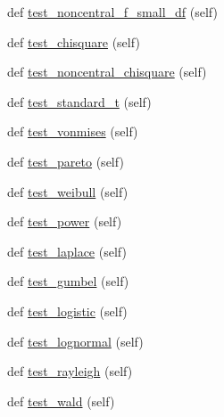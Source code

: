 \begin{DoxyCompactItemize}
\item 
def \hyperlink{classnumpy_1_1random_1_1tests_1_1test__random_1_1TestBroadcast_add84bec4de193f997366b0f0c9f57065}{test\+\_\+noncentral\+\_\+f\+\_\+small\+\_\+df} (self)
\item 
def \hyperlink{classnumpy_1_1random_1_1tests_1_1test__random_1_1TestBroadcast_aa9ed4d1e21057ee64ec67d97bd68fb9d}{test\+\_\+chisquare} (self)
\item 
def \hyperlink{classnumpy_1_1random_1_1tests_1_1test__random_1_1TestBroadcast_a1cd8cd8db8c0bd475aed24a6350083b0}{test\+\_\+noncentral\+\_\+chisquare} (self)
\item 
def \hyperlink{classnumpy_1_1random_1_1tests_1_1test__random_1_1TestBroadcast_a1b0a0d9e2eed0b7d30ef9bcee5ea97b8}{test\+\_\+standard\+\_\+t} (self)
\item 
def \hyperlink{classnumpy_1_1random_1_1tests_1_1test__random_1_1TestBroadcast_a2b38561ce5fd8be7f7de1d3da6d80758}{test\+\_\+vonmises} (self)
\item 
def \hyperlink{classnumpy_1_1random_1_1tests_1_1test__random_1_1TestBroadcast_a77f9eec0648cb9931b9553a539e4fbf3}{test\+\_\+pareto} (self)
\item 
def \hyperlink{classnumpy_1_1random_1_1tests_1_1test__random_1_1TestBroadcast_afd54e2ee72efb58e2fb034a2ba29a5ea}{test\+\_\+weibull} (self)
\item 
def \hyperlink{classnumpy_1_1random_1_1tests_1_1test__random_1_1TestBroadcast_a58abb751b2f08dd774d5916c95de4214}{test\+\_\+power} (self)
\item 
def \hyperlink{classnumpy_1_1random_1_1tests_1_1test__random_1_1TestBroadcast_a4b502eec5a77450f02f737076fe3cbe8}{test\+\_\+laplace} (self)
\item 
def \hyperlink{classnumpy_1_1random_1_1tests_1_1test__random_1_1TestBroadcast_a5817ccdde95cd0709767d55664d64c0c}{test\+\_\+gumbel} (self)
\item 
def \hyperlink{classnumpy_1_1random_1_1tests_1_1test__random_1_1TestBroadcast_a0bb498f1cbbf0948322e0b8b4afbd877}{test\+\_\+logistic} (self)
\item 
def \hyperlink{classnumpy_1_1random_1_1tests_1_1test__random_1_1TestBroadcast_a17865a1eb83569dba4c555c09aba27d6}{test\+\_\+lognormal} (self)
\item 
def \hyperlink{classnumpy_1_1random_1_1tests_1_1test__random_1_1TestBroadcast_aa13766f4687dbfcf189f31c786581413}{test\+\_\+rayleigh} (self)
\item 
def \hyperlink{classnumpy_1_1random_1_1tests_1_1test__random_1_1TestBroadcast_a204129dd11168e20b7b005ea063e2a8f}{test\+\_\+wald} (self)

\end{DoxyCompactItemize}
